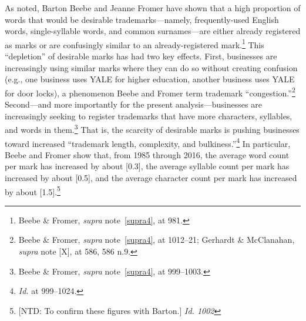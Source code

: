 \documentclass[letterpaper, 11pt, oneside]{article}
\begin{document}
As noted, Barton Beebe and Jeanne Fromer have shown that a high proportion of words that would be desirable trademarks—namely, frequently-used English words, single-syllable words, and common surnames—are either already registered as marks or are confusingly similar to an already-registered mark.\footnote{Beebe \& Fromer, \textit{supra} note~\ref{supra4}, at 981.} This ``depletion'' of desirable marks has had two key effects. First, businesses are increasingly using similar marks where they can do so without creating confusion (e.g., one business uses YALE for higher education, another business uses YALE for door locks), a phenomenon Beebe and Fromer term trademark ``congestion.''\footnote{Beebe \& Fromer, \textit{supra} note~\ref{supra4}, at 1012–21; Gerhardt \& McClanahan, \textit{supra} note [X], at 586, 586 n.9.} Second—and more importantly for the present analysis—businesses are increasingly seeking to register trademarks that have more characters, syllables, and words in them.\footnote{Beebe \& Fromer, \textit{supra} note~\ref{supra4}, at 999–1003.} That is, the scarcity of desirable marks is pushing businesses toward increased ``trademark length, complexity, and bulkiness.''\footnote{\textit{Id.} at 999–1024.}  In particular, Beebe and Fromer show that, from 1985 through 2016, the average word count per mark has increased by about [0.3], the average syllable count per mark has increased by about [0.5], and the average character count per mark has increased by about [1.5].\footnote{[NTD: To confirm these figures with Barton.] \textit{Id. 1002}}
\end{document}
